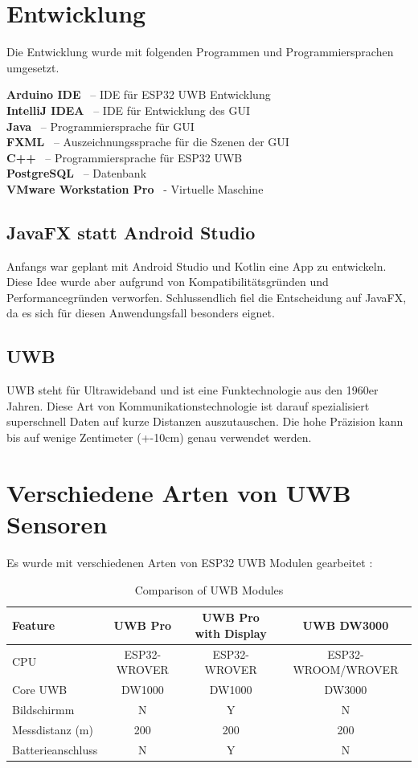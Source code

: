 \section{Entwicklung}
Die Entwicklung wurde mit folgenden Programmen und Programmiersprachen umgesetzt.

\textbf{Arduino IDE} \ – IDE für ESP32 UWB Entwicklung \\
\textbf{IntelliJ IDEA} \ – IDE für Entwicklung des GUI \\
\textbf{Java} \ – Programmiersprache für GUI \\
\textbf{FXML} \ – Auszeichnungssprache für die Szenen der GUI \\
\textbf{C++} \ – Programmiersprache für ESP32 UWB \\
\textbf{PostgreSQL} \ – Datenbank \\
\textbf{VMware Workstation Pro} \ - Virtuelle Maschine

\subsection{JavaFX statt Android Studio}
Anfangs war geplant mit Android Studio und Kotlin eine App zu entwickeln. Diese Idee wurde aber aufgrund von Kompatibilitätsgründen und Performancegründen verworfen. Schlussendlich fiel die Entscheidung auf JavaFX, da es sich für diesen Anwendungsfall besonders eignet. 

\subsection{UWB}

UWB steht für Ultrawideband und ist eine Funktechnologie aus den 1960er Jahren. Diese Art von Kommunikationstechnologie ist darauf spezialisiert superschnell Daten auf kurze Distanzen auszutauschen. Die hohe Präzision kann bis auf wenige Zentimeter (+-10cm) genau verwendet werden. \parencite{UWB}

\section{Verschiedene Arten von UWB Sensoren}

Es wurde mit verschiedenen Arten von ESP32 UWB Modulen gearbeitet \parencite{ArtenSensorn}: 

\begin{table}[h]
	\centering
	\small
	\begin{tabular}{|l|c|c|c|}
		\hline
		\textbf{Feature} & \textbf{UWB Pro} & \textbf{UWB Pro with Display} & \textbf{UWB DW3000} \\
		\hline
		CPU & ESP32-WROVER & ESP32-WROVER & ESP32-WROOM/WROVER \\
		\hline
		Core UWB & DW1000 & DW1000 & DW3000 \\
		\hline
		Bildschirmm & N & Y & N \\
		\hline
		Messdistanz (m) & 200 & 200 & 200 \\
		\hline
		Batterieanschluss & N & Y & N \\
		\hline
	\end{tabular}
	\caption{Comparison of UWB Modules}
	\label{tab:uwb_comparison}
\end{table}

